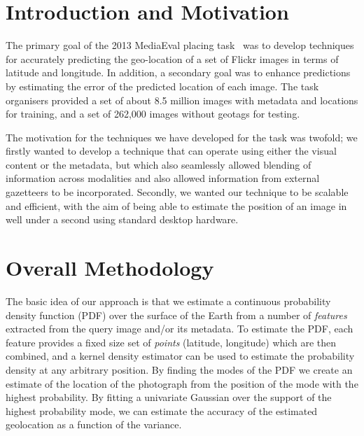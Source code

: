 \documentclass{../acm_proc_article-me11_tweaked}
\begin{document}

\section{Introduction and Motivation}
The primary goal of the 2013 MediaEval placing task~\cite{mediaevalPlacing13} was to develop techniques for accurately predicting the geo-location of a set of Flickr images in terms of latitude and longitude. In addition, a secondary goal was to enhance predictions by estimating the error of the predicted location of each image. The task organisers provided a set of about 8.5 million images with metadata and locations for training, and a set of 262,000 images without geotags for testing.

The motivation for the techniques we have developed for the task was twofold; we firstly wanted to develop a technique that can operate using either the visual content or the metadata, but which also seamlessly allowed blending of information across modalities and also allowed information from external gazetteers to be incorporated. Secondly, we wanted our technique to be scalable and efficient, with the aim of being able to estimate the position of an image in well under a second using standard desktop hardware.

\section{Overall Methodology}\label{sec:meth}
The basic idea of our approach is that we estimate a continuous probability density function (PDF) over the surface of the Earth from a number of \emph{features} extracted from the query image and/or its metadata. To estimate the PDF, each feature provides a fixed size set of \emph{points} (latitude, longitude) which are then combined, and a kernel density estimator can be used to estimate the probability density at any arbitrary position. By finding the modes of the PDF we create an estimate of the location of the photograph from the position of the mode with the highest probability. By fitting a univariate Gaussian over the support of the highest probability mode, we can estimate the accuracy of the estimated geolocation as a function of the variance.

\end{document}
